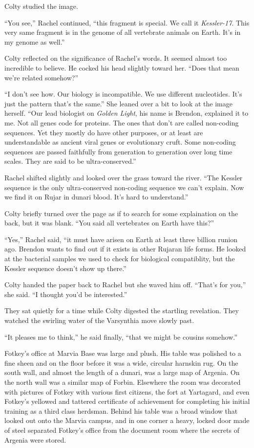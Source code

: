 Colty studied the image.

``You see,'' Rachel continued, ``this fragment is special. We call it \textit{Kessler-17}. This
very same fragment is in the genome of all vertebrate animals on Earth. It's in my genome as
well.''

Colty reflected on the significance of Rachel's words. It seemed almost too incredible to
believe. He cocked his head slightly toward her. ``Does that mean we're related somehow?''

``I don't see how. Our biology is incompatible. We use different nucleotides. It's just the
pattern that's the same.'' She leaned over a bit to look at the image herself. ``Our lead
biologist on \textit{Golden Light}, his name is Brendon, explained it to me. Not all genes code
for proteins. The ones that don't are called non-coding sequences. Yet they mostly do have other
purposes, or at least are understandable as ancient viral genes or evolutionary cruft. Some
non-coding sequences are passed faithfully from generation to generation over long time scales.
They are said to be ultra-conserved.''

Rachel shifted slightly and looked over the grass toward the river. ``The Kessler sequence is
the only ultra-conserved non-coding sequence we can't explain. Now we find it on Rujar in dunari
blood. It's hard to understand.''

Colty briefly turned over the page as if to search for some explaination on the back, but it was
blank. ``You said all vertebrates on Earth have this?''

``Yes,'' Rachel said, ``it must have arisen on Earth at least three billion runion ago. Brendon
wants to find out if it exists in other Rujaran life forms. He looked at the bacterial samples
we used to check for biological compatiblity, but the Kessler sequence doesn't show up there.''

Colty handed the paper back to Rachel but she waved him off. ``That's for you,'' she said. ``I
thought you'd be interested.''

They sat quietly for a time while Colty digested the startling revelation. They watched the
swirling water of the Varsynthia move slowly past.

``It pleases me to think,'' he said finally, ``that we might be cousins somehow.''

\spacebreak

Fotkey's office at Marvia Base was large and plush. His table was polished to a fine sheen and
on the floor before it was a wide, circular harnskin rug. On the south wall, and almost the
length of a dunari, was a large map of Argenia. On the north wall was a similar map of Forbin.
Elsewhere the room was decorated with pictures of Fotkey with various first citizens, the fort
at Yartagard, and even Fotkey's yellowed and tattered certificate of achievement for completing
his initial training as a third class herdsman. Behind his table was a broad window that looked
out onto the Marvia campus, and in one corner a heavy, locked door made of steel separated
Fotkey's office from the document room where the secrets of Argenia were stored.

